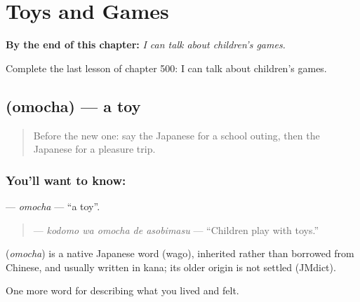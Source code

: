 
\chapter{Toys and Games}
\label{ch:ja-toys-and-games}

\begin{chapteropening}
\textbf{By the end of this chapter:} \emph{I can talk about children's games.}

Complete the last lesson of chapter 500: I can talk about children's games.
\end{chapteropening}

\section[\texorpdfstring{\ja{おもちゃ} (omocha)}{おもちゃ (omocha)}]{ (omocha) — a toy}

\label{lesson:JA-C500-omocha}



\begin{quote}
Before the new one: say the Japanese for a school outing, then the Japanese for a pleasure trip.
\end{quote}

\subsection*{You'll want to know: }
\textbf{} — \emph{omocha} — \textquotedblleft{}a toy\textquotedblright{}.

\begin{quote}
\textbf{  } — \emph{kodomo wa omocha de asobimasu} — \textquotedblleft{}Children play with toys.\textquotedblright{}
\end{quote}

\begin{cousinweb}
\textbf{} (\emph{omocha}) is a native Japanese word (wago), inherited rather than borrowed from Chinese, and usually written in kana; its older origin is not settled (JMdict).
\end{cousinweb}

\begin{grammarlens}[title={What you've built}]
One more word for describing what you lived and felt.
\end{grammarlens}

